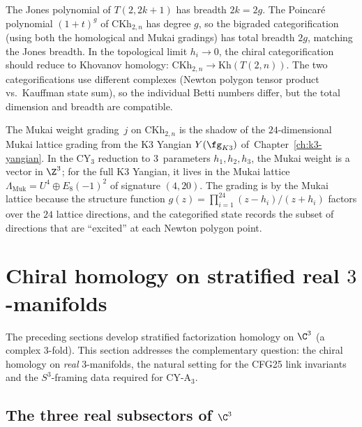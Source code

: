 \begin{remark}
\label{rem:jones-limit}
The Jones polynomial of $T(2, 2k+1)$ has breadth $2k = 2g$. The Poincar\'{e} polynomial $(1+t)^g$ of $\mathrm{CKh}_{2,n}$ has degree $g$, so the bigraded categorification (using both the homological and Mukai gradings) has total breadth $2g$, matching the Jones breadth. In the topological limit $h_i \to 0$, the chiral categorification should reduce to Khovanov homology: $\mathrm{CKh}_{2,n} \to \mathrm{Kh}(T(2,n))$. The two categorifications use different complexes (Newton polygon tensor product vs.\ Kauffman state sum), so the individual Betti numbers differ, but the total dimension and breadth are compatible.
\end{remark}

\begin{remark}
\label{rem:mukai-grading-knots}
The Mukai weight grading~$j$ on $\mathrm{CKh}_{2,n}$ is the shadow of the $24$-dimensional Mukai lattice grading from the K3 Yangian $Y(\fg_{K3})$ of~Chapter~\ref{ch:k3-yangian}. In the CY$_3$ reduction to $3$~parameters $h_1, h_2, h_3$, the Mukai weight is a vector in $\Z^3$; for the full K3 Yangian, it lives in the Mukai lattice $\Lambda_{\mathrm{Muk}} = U^4 \oplus E_8(-1)^2$ of signature $(4, 20)$. The grading is by the Mukai lattice because the structure function $g(z) = \prod_{i=1}^{24}(z - h_i)/(z + h_i)$ factors over the $24$ lattice directions, and the categorified state records the subset of directions that are ``excited'' at each Newton polygon point.
\end{remark}

\section{Chiral homology on stratified real \texorpdfstring{$3$}{3}-manifolds}
\label{sec:chiral-homology-3folds}

The preceding sections develop stratified factorization homology on $\C^3$ (a complex $3$-fold). This section addresses the complementary question: the chiral homology on \emph{real} $3$-manifolds, the natural setting for the CFG25 link invariants and the $S^3$-framing data required for CY-A$_3$.

\subsection{The three real subsectors of \texorpdfstring{$\C^3$}{C-3}}
\label{subsec:three-real-subsectors}


